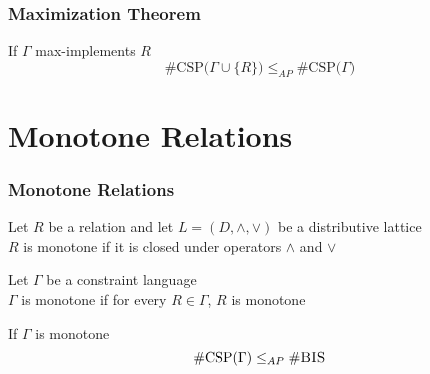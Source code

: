 \documentclass[a4paper,handout]{beamer}
\newcommand{\ccsp}{\#CSP}
\newcommand{\cbis}{\#\textsc{BIS}}
\newcommand{\aple}{\le_{AP}}
\theoremstyle{definition}
\begin{document}
\begin{frame}
\frametitle{Maximization Theorem}
\begin{theorem}
If \(\Gamma\) max-implements \(R\)
\[\mathrm{\#CSP(}\Gamma \cup \{R\}\mathrm{)} \aple \mathrm{\#CSP(}\Gamma\mathrm{)}\]
\end{theorem}
\end{frame}

\section{Monotone Relations}

\begin{frame}
\frametitle{Monotone Relations}
\begin{definition}
Let \(R\) be a relation and let \(L=(D, \wedge, \vee)\) be a distributive lattice\\
\(R\) is monotone if it is closed under operators \(\wedge\) and \(\vee\) 
\end{definition}

\begin{definition}
Let \(\Gamma\) be a constraint language\\
\(\Gamma\) is monotone if for every \(R\in \Gamma\), \(R\) is monotone
\end{definition}

\begin{theorem}
If \(\Gamma\) is monotone
\[\mathrm{\ccsp(}\Gamma\mathrm{)}\aple\mathrm{\cbis}\]
\end{theorem}
\end{frame}
\end{document}
